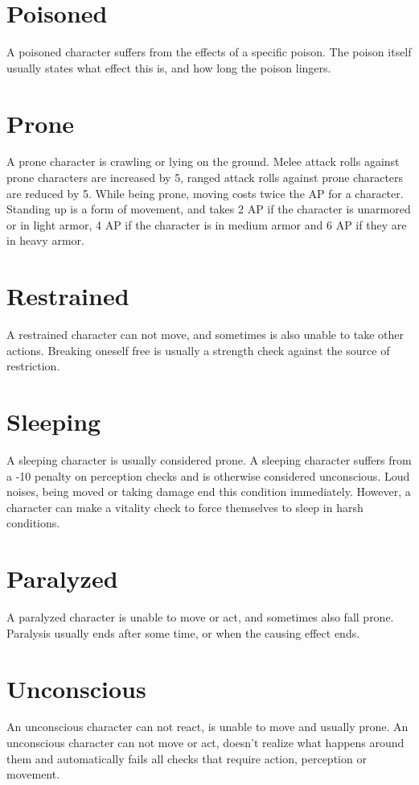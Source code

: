 \section{Poisoned}\label{condition:poisoned}
A poisoned character suffers from the effects of a specific poison.
The poison itself usually states what effect this is, and how long the poison lingers.

\section{Prone}\label{condition:prone}
A prone character is crawling or lying on the ground.
Melee attack rolls against prone characters are increased by 5, ranged attack rolls against prone characters are reduced by 5.
While being prone, moving costs twice the AP for a character.
Standing up is a form of movement, and takes 2 AP if the character is unarmored or in light armor, 4 AP if the character is in medium armor and 6 AP if they are in heavy armor.

\section{Restrained}\label{condition:restrained}
A restrained character can not move, and sometimes is also unable to take other actions.
Breaking oneself free is usually a strength check against the source of restriction.

\section{Sleeping}\label{condition:sleeping}
A sleeping character is usually considered prone.
A sleeping character suffers from a -10 penalty on perception checks and is otherwise considered unconscious.
Loud noises, being moved or taking damage end this condition immediately.
However, a character can make a vitality check to force themselves to sleep in harsh conditions.


\section{Paralyzed}\label{condition:paralyzed}
A paralyzed character is unable to move or act, and sometimes also fall prone.
Paralysis usually ends after some time, or when the causing effect ends.

\section{Unconscious}\label{condition:unconscious}
An unconscious character can not react, is unable to move and usually prone.
An unconscious character can not move or act, doesn't realize what happens around them and automatically fails all checks that require action, perception or movement.
